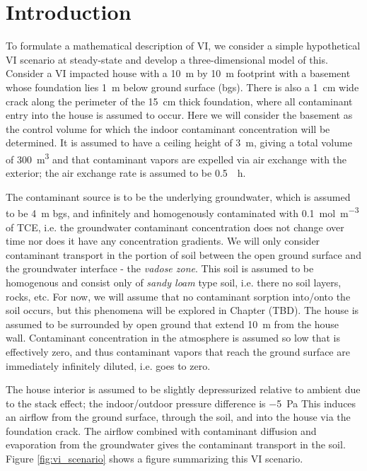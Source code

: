 \section{Introduction}

To formulate a mathematical description of VI, we consider a simple hypothetical VI scenario at steady-state and develop a three-dimensional model of this.
Consider a VI impacted house with a \SI{10}{\metre} by \SI{10}{\metre} footprint with a basement whose foundation lies \SI{1}{\metre} below ground surface (bgs).
There is also a \SI{1}{\centi\metre} wide crack along the perimeter of the \SI{15}{\centi\metre} thick foundation, where all contaminant entry into the house is assumed to occur.
Here we will consider the basement as the control volume for which the indoor contaminant concentration will be determined.
It is assumed to have a ceiling height of \SI{3}{\metre}, giving a total volume of \SI{300}{\metre\cubed}
and that contaminant vapors are expelled via air exchange with the exterior; the air exchange rate is assumed to be \SI{0.5}{\per\hour}.\par

The contaminant source is to be the underlying groundwater, which is assumed to be \SI{4}{\metre} bgs, and infinitely and homogenously contaminated with \SI{0.1}{\mol\per\metre\cubed} of TCE, i.e. the groundwater contaminant concentration does not change over time nor does it have any concentration gradients.
We will only consider contaminant transport in the portion of soil between the open ground surface and the groundwater interface - the \textit{vadose zone}.
This soil is assumed to be homogenous and consist only of \textit{sandy loam} type soil, i.e. there no soil layers, rocks, etc.
For now, we will assume that no contaminant sorption into/onto the soil occurs, but this phenomena will be explored in Chapter (TBD).%
The house is assumed to be surrounded by open ground that extend \SI{10}{\metre} from the house wall.
Contaminant concentration in the atmosphere is assumed so low that is effectively zero, and thus contaminant vapors that reach the ground surface are immediately infinitely diluted, i.e. goes to zero. \par

The house interior is assumed to be slightly depressurized relative to ambient due to the stack effect; the indoor/outdoor pressure difference is \SI{-5}{\pascal}
This induces an airflow from the ground surface, through the soil, and into the house via the foundation crack.
The airflow combined with contaminant diffusion and evaporation from the groundwater gives the contaminant transport in the soil.
Figure \ref{fig:vi_scenario} shows a figure summarizing this VI scenario.\par

